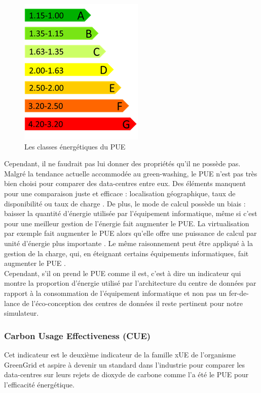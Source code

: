 \begin{figure}[h]
	\begin{center}
		\includegraphics[scale=0.6]{partie2/images/classeEnergetique.png}
	\end{center}
	\caption{Les classes énergétiques du PUE}
\end{figure}
\newpage
Cependant, il ne faudrait pas lui donner des propriétés qu'il ne possède pas. Malgré la tendance actuelle accommodée au green-washing, le PUE n'est pas très bien choisi pour comparer des data-centres entre eux. Des éléments manquent pour une comparaison juste et efficace : localisation géographique, taux de disponibilité ou taux de charge \cite{badPUEOtherMetrics}. De plus, le mode de calcul possède un biais : baisser la quantité d'énergie utilisée par l'équipement informatique, même si c'est pour une meilleur gestion de l'énergie fait augmenter le PUE. La virtualisation par exemple fait augmenter le PUE alors qu'elle offre une puissance de calcul par unité d'énergie plus importante \cite{badPUEVirtualisation}. Le même raisonnement peut être appliqué à la gestion de la charge, qui, en éteignant certains équipements informatiques, fait augmenter le PUE \cite{badPUECharge}.\\

Cependant, s'il on prend le PUE comme il est, c'est à dire un indicateur qui montre la proportion d'énergie utilisé par l'architecture du centre de données par rapport à la consommation de l'équipement informatique et non pas un fer-de-lance de l'éco-conception des centres de données il reste pertinent pour notre simulateur.

\subsubsection{Carbon Usage Effectiveness (CUE)}
Cet indicateur est le deuxième indicateur de la famille xUE de l'organisme GreenGrid et aspire à devenir un standard dans l'industrie pour comparer les data-centres sur leurs rejets de dioxyde de carbone comme l'a été le PUE pour l'efficacité énergétique.

